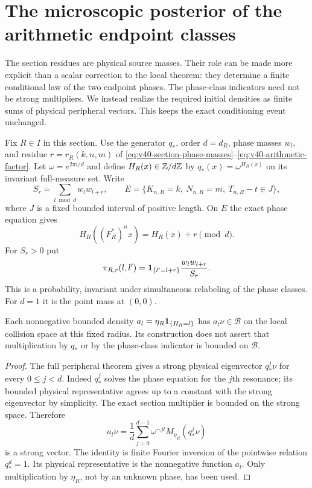 \section{The microscopic posterior of the arithmetic endpoint classes}
\label{sec:v42-phase-posterior}
The section residues are physical source masses. Their role can be
made more explicit than a scalar correction to the local theorem:
they determine a finite conditional law of the two endpoint phases.
The phase-class indicators need not be strong multipliers. We instead
realize the required initial densities as finite sums of physical
peripheral vectors. This keeps the exact conditioning event unchanged.

Fix $R\in I$ in this section. Use the generator $q_*$, order $d=d_R$,
phase masses $w_l$, and residue $r=r_R(k,n,m)$ of
\eqref{eq:v40-section-phase-masses}--\eqref{eq:v40-arithmetic-factor}.
Let $\omega=e^{2\pi i/d}$ and define $H_R(x)\in\mathbb Z/d\mathbb Z$ by
$q_*(x)=\omega^{H_R(x)}$ on its invariant full-measure set. Write
\[
 S_r=\sum_{l\bmod d}w_lw_{l+r},\qquad
 E=\{K_{n,R}=k,\ N_{n,R}=m,\ T_{n,R}-t\in J\},
\]
where $J$ is a fixed bounded interval of positive length. On $E$ the
exact phase equation gives
\begin{equation}\label{eq:v42-exact-phase-pair}
 H_R((F_R^*)^n x)=H_R(x)+r\pmod d.
\end{equation}
For $S_r>0$ put
\begin{equation}\label{eq:v42-phase-posterior}
 \pi_{R,r}(l,l')=
   \one_{\{l'=l+r\}}\frac{w_lw_{l+r}}{S_r}.
\end{equation}
This is a probability, invariant under simultaneous relabeling of the
phase classes. For $d=1$ it is the point mass at $(0,0)$.

\begin{lemma}
\label{lem:v42-class-source}
Each nonnegative bounded density
$a_l=\eta_R\mathbf1_{\{H_R=l\}}$ has $a_l\nu\in\mathcal B$ on the
local collision space at this fixed radius. Its construction does not
assert that multiplication by $q_*$ or by the phase-class indicator is
bounded on $\mathcal B$.
\end{lemma}
\begin{proof}
The full peripheral theorem gives a strong physical eigenvector
$q_*^j\nu$ for every $0\le j<d$. Indeed $q_*^j$ solves the phase
equation for the $j$th resonance; its bounded physical representative
agrees up to a constant with the strong eigenvector by simplicity.
The exact section multiplier is bounded on the strong space. Therefore
\begin{equation}\label{eq:v42-class-source-fourier}
 a_l\nu=\frac1d\sum_{j=0}^{d-1}
                        \omega^{-jl}M_{\eta_R}(q_*^j\nu)
\end{equation}
is a strong vector. The identity is finite Fourier inversion of the
pointwise relation $q_*^d=1$. Its physical representative is the
nonnegative function $a_l$. Only multiplication by $\eta_R$, not by
an unknown phase, has been used.
\end{proof}

